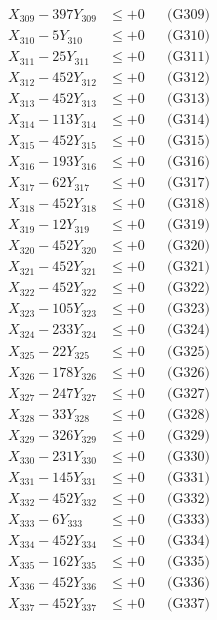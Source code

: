 \documentclass[a4paper,10pt]{article}
\begin{document}
{\begin{align}
X_{309} - 397Y_{309} &\leq +0 && \text{(G309)} \\
X_{310} - 5Y_{310} &\leq +0 && \text{(G310)} \\
\allowbreak
X_{311} - 25Y_{311} &\leq +0 && \text{(G311)} \\
X_{312} - 452Y_{312} &\leq +0 && \text{(G312)} \\
X_{313} - 452Y_{313} &\leq +0 && \text{(G313)} \\
X_{314} - 113Y_{314} &\leq +0 && \text{(G314)} \\
X_{315} - 452Y_{315} &\leq +0 && \text{(G315)} \\
X_{316} - 193Y_{316} &\leq +0 && \text{(G316)} \\
X_{317} - 62Y_{317} &\leq +0 && \text{(G317)} \\
X_{318} - 452Y_{318} &\leq +0 && \text{(G318)} \\
X_{319} - 12Y_{319} &\leq +0 && \text{(G319)} \\
X_{320} - 452Y_{320} &\leq +0 && \text{(G320)} \\
\allowbreak
X_{321} - 452Y_{321} &\leq +0 && \text{(G321)} \\
X_{322} - 452Y_{322} &\leq +0 && \text{(G322)} \\
X_{323} - 105Y_{323} &\leq +0 && \text{(G323)} \\
X_{324} - 233Y_{324} &\leq +0 && \text{(G324)} \\
X_{325} - 22Y_{325} &\leq +0 && \text{(G325)} \\
X_{326} - 178Y_{326} &\leq +0 && \text{(G326)} \\
X_{327} - 247Y_{327} &\leq +0 && \text{(G327)} \\
X_{328} - 33Y_{328} &\leq +0 && \text{(G328)} \\
X_{329} - 326Y_{329} &\leq +0 && \text{(G329)} \\
X_{330} - 231Y_{330} &\leq +0 && \text{(G330)} \\
\allowbreak
X_{331} - 145Y_{331} &\leq +0 && \text{(G331)} \\
X_{332} - 452Y_{332} &\leq +0 && \text{(G332)} \\
X_{333} - 6Y_{333} &\leq +0 && \text{(G333)} \\
X_{334} - 452Y_{334} &\leq +0 && \text{(G334)} \\
X_{335} - 162Y_{335} &\leq +0 && \text{(G335)} \\
X_{336} - 452Y_{336} &\leq +0 && \text{(G336)} \\
X_{337} - 452Y_{337} &\leq +0 && \text{(G337)} \\

\end{align}}
\end{document}
